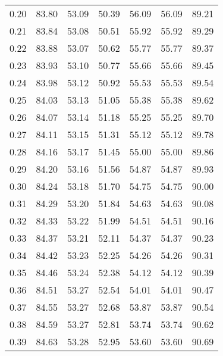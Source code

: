 \begin{tabular}{|c|c|c|c|c|c|c|}
      0.20 &     83.80 &     53.09 &      50.39 &   56.09 &      56.09 &         89.21 \\
      0.21 &     83.84 &     53.08 &      50.51 &   55.92 &      55.92 &         89.29 \\
      0.22 &     83.88 &     53.07 &      50.62 &   55.77 &      55.77 &         89.37 \\
      0.23 &     83.93 &     53.10 &      50.77 &   55.66 &      55.66 &         89.45 \\
      0.24 &     83.98 &     53.12 &      50.92 &   55.53 &      55.53 &         89.54 \\
      0.25 &     84.03 &     53.13 &      51.05 &   55.38 &      55.38 &         89.62 \\
      0.26 &     84.07 &     53.14 &      51.18 &   55.25 &      55.25 &         89.70 \\
      0.27 &     84.11 &     53.15 &      51.31 &   55.12 &      55.12 &         89.78 \\
      0.28 &     84.16 &     53.17 &      51.45 &   55.00 &      55.00 &         89.86 \\
      0.29 &     84.20 &     53.16 &      51.56 &   54.87 &      54.87 &         89.93 \\
      0.30 &     84.24 &     53.18 &      51.70 &   54.75 &      54.75 &         90.00 \\
      0.31 &     84.29 &     53.20 &      51.84 &   54.63 &      54.63 &         90.08 \\
      0.32 &     84.33 &     53.22 &      51.99 &   54.51 &      54.51 &         90.16 \\
      0.33 &     84.37 &     53.21 &      52.11 &   54.37 &      54.37 &         90.23 \\
      0.34 &     84.42 &     53.23 &      52.25 &   54.26 &      54.26 &         90.31 \\
      0.35 &     84.46 &     53.24 &      52.38 &   54.12 &      54.12 &         90.39 \\
      0.36 &     84.51 &     53.27 &      52.54 &   54.01 &      54.01 &         90.47 \\
      0.37 &     84.55 &     53.27 &      52.68 &   53.87 &      53.87 &         90.54 \\
      0.38 &     84.59 &     53.27 &      52.81 &   53.74 &      53.74 &         90.62 \\
      0.39 &     84.63 &     53.28 &      52.95 &   53.60 &      53.60 &         90.69 \\

\end{tabular}
